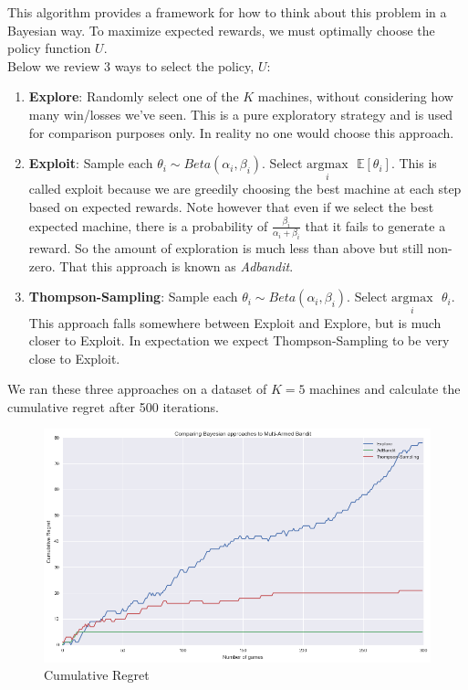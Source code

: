 \documentclass{article}
\begin{document}
This algorithm provides a framework for how to think about this problem in a Bayesian way. To maximize expected rewards, we must optimally choose the policy function $U$.\\

Below we review 3 ways to select the policy, $U$:

\begin{enumerate}
\item \textbf{Explore}: Randomly select one of the $K$ machines, without considering how many win/losses we've seen. This is a pure exploratory strategy and is used for comparison purposes only. In reality no one would choose this approach.
\item \textbf{Exploit}: Sample each $\theta_i \sim Beta(\alpha_i, \beta_i)$. Select $\underset{i}{\text{argmax}}\text{ }\mathbb{E}[\theta_i]$. This is called exploit because we are greedily choosing the best machine at each step based on expected rewards. Note however that even if we select the best expected machine, there is a probability of $\frac{\beta_i}{\alpha_i + \beta_i}$ that it fails to generate a reward. So the amount of exploration is much less than above but still non-zero. That this approach is known as \textit{Adbandit}.
\item \textbf{Thompson-Sampling}: Sample each $\theta_i \sim Beta(\alpha_i, \beta_i)$. Select $\underset{i}{\text{argmax}}\text{ }\theta_i$. This approach falls somewhere between Exploit and Explore, but is much closer to Exploit. In expectation we expect Thompson-Sampling to be very close to Exploit.
\end{enumerate}

We ran these three approaches on a dataset of $K=5$ machines and calculate the cumulative regret after 500 iterations.

\begin{figure}[H]
\centering
\includegraphics[scale=0.5]{thompson_regret.png}
\caption{Cumulative Regret}
\end{figure}
\end{document}
